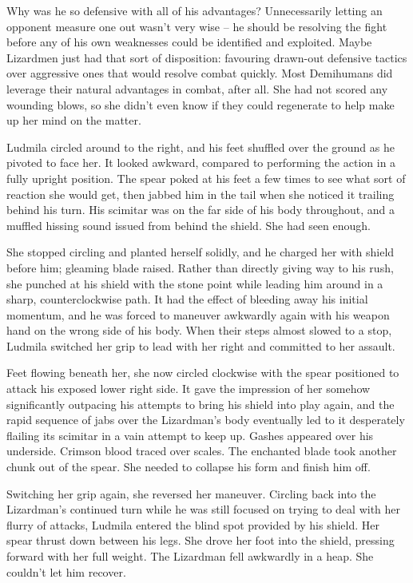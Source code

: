  

Why was he so defensive with all of his advantages? Unnecessarily letting an opponent measure one out wasn’t very wise – he should be resolving the fight before any of his own weaknesses could be identified and exploited. Maybe Lizardmen just had that sort of disposition: favouring drawn-out defensive tactics over aggressive ones that would resolve combat quickly. Most Demihumans did leverage their natural advantages in combat, after all. She had not scored any wounding blows, so she didn’t even know if they could regenerate to help make up her mind on the matter.

 

Ludmila circled around to the right, and his feet shuffled over the ground as he pivoted to face her. It looked awkward, compared to performing the action in a fully upright position. The spear poked at his feet a few times to see what sort of reaction she would get, then jabbed him in the tail when she noticed it trailing behind his turn. His scimitar was on the far side of his body throughout, and a muffled hissing sound issued from behind the shield. She had seen enough.

 

She stopped circling and planted herself solidly, and he charged her with shield before him; gleaming blade raised. Rather than directly giving way to his rush, she punched at his shield with the stone point while leading him around in a sharp, counterclockwise path. It had the effect of bleeding away his initial momentum, and he was forced to maneuver awkwardly again with his weapon hand on the wrong side of his body. When their steps almost slowed to a stop, Ludmila switched her grip to lead with her right and committed to her assault.

 

Feet flowing beneath her, she now circled clockwise with the spear positioned to attack his exposed lower right side. It gave the impression of her somehow significantly outpacing his attempts to bring his shield into play again, and the rapid sequence of jabs over the Lizardman’s body eventually led to it desperately flailing its scimitar in a vain attempt to keep up. Gashes appeared over his underside. Crimson blood traced over scales. The enchanted blade took another chunk out of the spear. She needed to collapse his form and finish him off.

 

Switching her grip again, she reversed her maneuver. Circling back into the Lizardman’s continued turn while he was still focused on trying to deal with her flurry of attacks, Ludmila entered the blind spot provided by his shield. Her spear thrust down between his legs. She drove her foot into the shield, pressing forward with her full weight. The Lizardman fell awkwardly in a heap. She couldn’t let him recover.

